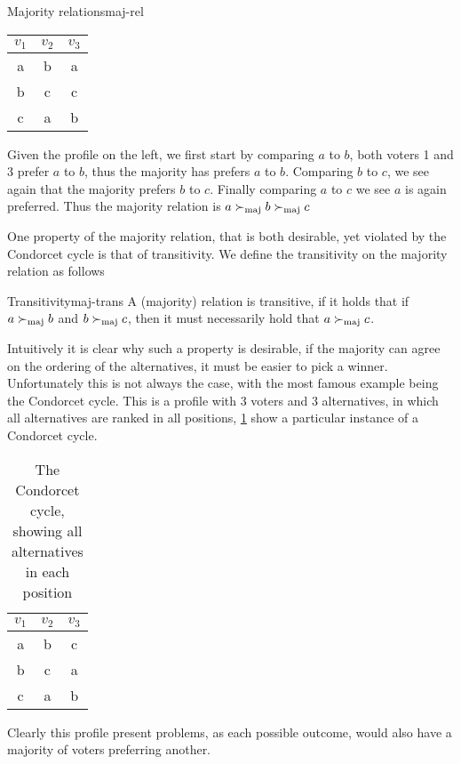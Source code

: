\begin{example}{Majority relations}{maj-rel}
	\begin{minipage}{0.15\linewidth}
		\begin{tabular}{ccc}
			\toprule
			$v_1$ & $v_2$ & $v_3$ \\
			\midrule
			a & b & a \\
			b & c & c \\
			c & a & b \\
			\bottomrule
		\end{tabular}
	\end{minipage}
	\hspace{2em}
	\begin{minipage}{0.70\linewidth}
		Given the profile on the left, we first start by comparing $a$ to $b$, both voters 1 and 3 prefer $a$ to $b$, thus the majority has prefers $a$ to $b$. Comparing $b$ to $c$, we see again that the majority prefers $b$ to $c$. Finally comparing $a$ to $c$ we see $a$ is again preferred. Thus the majority relation is $a \succ_{\text{maj}} b \succ_{\text{maj}} c$
	\end{minipage}
\end{example}

One property of the majority relation, that is both desirable, yet violated by the Condorcet cycle is that of transitivity. We define the transitivity on the majority relation as follows

\begin{definition}{Transitivity}{maj-trans}
	A (majority) relation is transitive, if it holds that if $a \succ_{\text{maj}} b$ and $b \succ_{\text{maj}} c$, then it must necessarily hold that $a \succ_{\text{maj}} c$.
\end{definition}

Intuitively it is clear why such a property is desirable, if the majority can agree on the ordering of the alternatives, it must be easier to pick a winner. Unfortunately this is not always the case, with the most famous example being the Condorcet cycle. This is a profile with 3 voters and 3 alternatives, in which all alternatives are ranked in all positions, \cref{tab: Condorcet} show a particular instance of a Condorcet cycle.

 
\begin{table}[h]
\centering
\begin{tabular}{ccc}
	\toprule
	$v_1$ & $v_2$ & $v_3$ \\
	\midrule
	a & b & c \\
	b & c & a \\
	c & a & b \\
	\bottomrule
\end{tabular}
	\caption{The Condorcet cycle, showing all alternatives in each position}
	\label{tab: Condorcet}
\end{table}

Clearly this profile present problems, as each possible outcome, would also have a majority of voters preferring another. 
